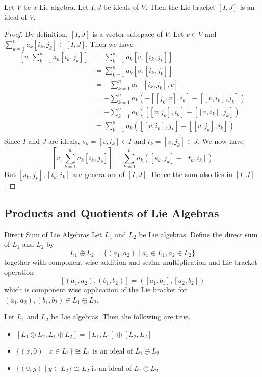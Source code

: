 \documentclass[a4paper]{article}
\begin{document}
\begin{lmm}{}{} Let $V$ be a Lie algebra. Let $I,J$ be ideals of $V$. Then the Lie bracket $[I,J]$ is an ideal of $V$. \tcbline
\begin{proof}
By definition, $[I,J]$ is a vector subspace of $V$. Let $v\in V$ and $\sum_{k=1}^na_k[i_k,j_k]\in[I,J]$. Then we have
\begin{align*}
\left[v,\sum_{k=1}^na_k[i_k,j_k]\right]&=\sum_{k=1}^na_k[v,[i_k,j_k]]\\
&=\sum_{k=1}^na_k[v,[i_k,j_k]]\\
&=-\sum_{k=1}^na_k[[i_k,j_k],v]\\
&=-\sum_{k=1}^na_k\left(-[[j_k,v],i_k]-[[v,i_k],j_k]\right)\\
&=-\sum_{k=1}^na_k\left([[v,j_k],i_k]-[[v,i_k],j_k]\right)\\
&=\sum_{k=1}^na_k\left([[v,i_k],j_k]-[[v,j_k],i_k]\right)\\
\end{align*}
Since $I$ and $J$ are ideals, $s_k=[v,i_k]\in I$ and $t_k=[v,j_k]\in J$. We now have $$\left[v,\sum_{k=1}^na_k[i_k,j_k]\right]=\sum_{k=1}^na_k\left([s_k,j_k]-[t_k,i_k]\right)$$ But $[s_k,j_k],[t_k,i_k]$ are generators of $[I,J]$. Hence the sum also lies in $[I,J]$. 
\end{proof}
\end{lmm}

\subsection{Products and Quotients of Lie Algebras}
\begin{defn}{Direct Sum of Lie Algebras}{} Let $L_1$ and $L_2$ be Lie algebras. Define the direct sum of $L_1$ and $L_2$ by $$L_1\oplus L_2=\{(a_1,a_2)\;|\;a_1\in L_1,a_2\in L_2\}$$ together with component wise addition and scalar multiplication and Lie bracket operation $$[(a_1,a_2),(b_1,b_2)]=([a_1,b_1],[a_2,b_2])$$ which is component wise application of the Lie bracket for $(a_1,a_2),(b_1,b_2)\in L_1\oplus L_2$. 
\end{defn}

\begin{prp}{}{} Let $L_1$ and $L_2$ be Lie algebras. Then the following are true. 
\begin{itemize}
\item $[L_1\oplus L_2,L_1\oplus L_2]=[L_1,L_1]\oplus[L_2,L_2]$
\item $\{(x,0)\;|\;x\in L_1\}\cong L_1$ is an ideal of $L_1\oplus L_2$
\item $\{(0,y)\;|\;y\in L_2\}\cong L_2$ is an ideal of $L_1\oplus L_2$
\end{itemize}
\end{prp}
\end{document}
